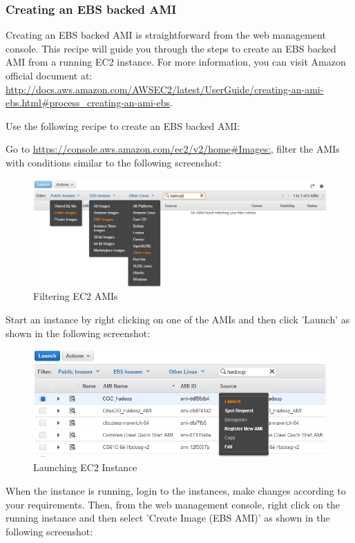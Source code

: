 \subsubsection*{Creating an EBS backed AMI}
Creating an EBS backed AMI is straightforward from the web management console. This recipe will guide you through the steps to create an EBS backed AMI from a running EC2 instance. For more information, you can visit Amazon official document at: \url{http://docs.aws.amazon.com/AWSEC2/latest/UserGuide/creating-an-ami-ebs.html#process_creating-an-ami-ebs}.

Use the following recipe to create an EBS backed AMI:

Go to \url{https://console.aws.amazon.com/ec2/v2/home#Images:}, filter the AMIs with conditions similar to the following screenshot:
\begin{figure}[ht]
  \centering
  \includegraphics[width=.90\textwidth]{figs/5163os_08_29.png}
  \caption{Filtering EC2 AMIs}\label{fig:aws.ec2.ami.filter}
\end{figure} 
Start an instance by right clicking on one of the AMIs and then click 'Launch' as shown in the following screenshot:
\begin{figure}[ht]
  \centering
  \includegraphics[width=.90\textwidth]{figs/5163os_08_30.png}
  \caption{Launching EC2 Instance}\label{fig:aws.launch.instance}
\end{figure} 
When the instance is running, login to the instances, make changes according to your requirements. Then, from the web management console, right click on the running instance and then select 'Create Image (EBS AMI)' as shown in the following screenshot:
